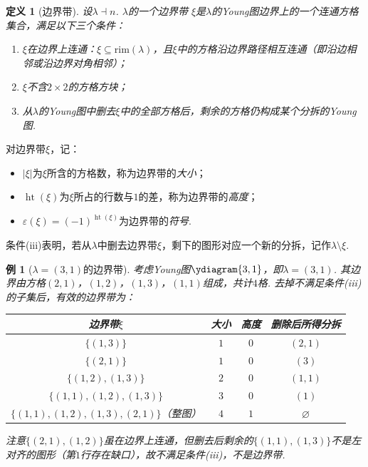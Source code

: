 \documentclass{sjtureport}
\newtheorem{definition}{定义}[chapter]
\newtheorem{example}{例}[chapter]
\renewcommand{\arraystretch}{1}
\begin{document}
\begin{definition}[边界带]\label{def:borderstrip}
    设$\lambda \dashv n$. $\lambda$的一个\emph{边界带} $\xi$是$\lambda$的Young图边界上的一个连通方格集合，满足以下三个条件：
    \begin{enumerate}[label={(\roman*)},nosep]
        \item $\xi$在边界上连通：$\xi\subseteq\mathrm{rim}(\lambda)$，且$\xi$中的方格沿边界路径相互连通（即沿边相邻或沿边界对角相邻）；
        \item $\xi$不含$2\times2$的方格方块；
        \item 从$\lambda$的Young图中删去$\xi$中的全部方格后，剩余的方格仍构成某个分拆的Young图. 
    \end{enumerate}
\end{definition}

对边界带$\xi$，记：
\begin{itemize}[nosep]
    \item $|\xi|$为$\xi$所含的方格数，称为边界带的\emph{大小}；
        \item $\operatorname{ht}(\xi)$为$\xi$所占的行数与$1$的差，称为边界带的\emph{高度}；
    \item $\varepsilon(\xi)=(-1)^{\operatorname{ht}(\xi)}$为边界带的\emph{符号}. 
\end{itemize}
条件(iii)表明，若从$\lambda$中删去边界带$\xi$，剩下的图形对应一个新的分拆，记作$\lambda\setminus\xi$. 

\begin{example}[$\lambda=(3,1)$的边界带]\label{ex:bs-31}
    考虑Young图$\ydiagram{3,1}$，即$\lambda=(3,1)$. 其边界由方格$(2,1)$，$(1,2)$，$(1,3)$，$(1,1)$组成，共计$4$格. 去掉不满足条件(iii)的子集后，有效的边界带为：

    \begin{center}
    \renewcommand{\arraystretch}{1.25}
    \begin{tabular}{c|c|c|c}
        边界带$\xi$ & 大小 & 高度 & 删除后所得分拆 \\
        \hline
        $\{(1,3)\}$   & $1$ & $0$ & $(2,1)$ \\
        $\{(2,1)\}$   & $1$ & $0$ & $(3)$   \\
        $\{(1,2),(1,3)\}$ & $2$ & $0$ & $(1,1)$ \\
        $\{(1,1),(1,2),(1,3)\}$ & $3$ & $0$ & $(1)$ \\
        $\{(1,1),(1,2),(1,3),(2,1)\}$（整图）& $4$ & $1$ & $\varnothing$
    \end{tabular}
    \end{center}

    注意$\{(2,1),(1,2)\}$虽在边界上连通，但删去后剩余的$\{(1,1),(1,3)\}$不是左对齐的图形（第$1$行存在缺口），故不满足条件(iii)，不是边界带. 
\end{example}
\end{document}
